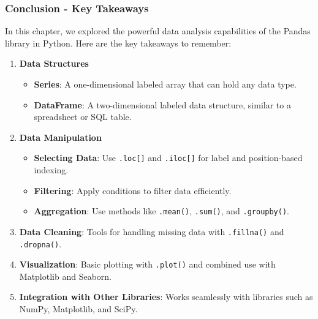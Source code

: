 \documentclass{beamer}
\begin{document}
\begin{frame}[fragile]
    \frametitle{Conclusion - Key Takeaways}
    In this chapter, we explored the powerful data analysis capabilities of the Pandas library in Python. Here are the key takeaways to remember:
    
    \begin{enumerate}
        \item \textbf{Data Structures}
        \begin{itemize}
            \item \textbf{Series}: A one-dimensional labeled array that can hold any data type.
            \item \textbf{DataFrame}: A two-dimensional labeled data structure, similar to a spreadsheet or SQL table.
        \end{itemize}
        
        \item \textbf{Data Manipulation}
        \begin{itemize}
            \item \textbf{Selecting Data}: Use \texttt{.loc[]} and \texttt{.iloc[]} for label and position-based indexing.
            \item \textbf{Filtering}: Apply conditions to filter data efficiently.
            \item \textbf{Aggregation}: Use methods like \texttt{.mean()}, \texttt{.sum()}, and \texttt{.groupby()}.
        \end{itemize}
        
        \item \textbf{Data Cleaning}: Tools for handling missing data with \texttt{.fillna()} and \texttt{.dropna()}.
        
        \item \textbf{Visualization}: Basic plotting with \texttt{.plot()} and combined use with Matplotlib and Seaborn.
        
        \item \textbf{Integration with Other Libraries}: Works seamlessly with libraries such as NumPy, Matplotlib, and SciPy.
    \end{enumerate}
\end{frame}
\end{document}
